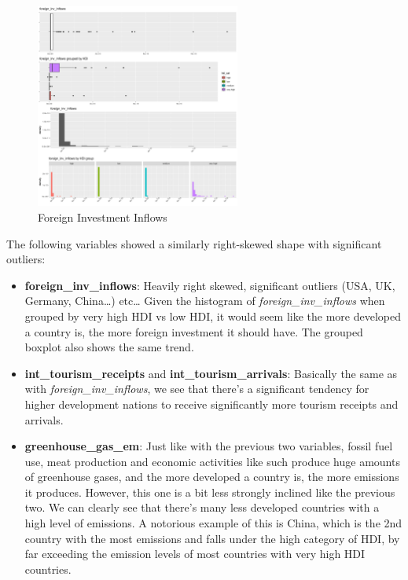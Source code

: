 \documentclass[]{article}
\providecommand{\tightlist}{%
  \setlength{\itemsep}{0pt}\setlength{\parskip}{0pt}}
\begin{document}
\begin{figure}
\centering
\includegraphics[width=0.6\textwidth,height=\textheight]{./img/foreign_inv_inflows.png}
\caption{Foreign Investment Inflows}
\end{figure}

The following variables showed a similarly right-skewed shape with
significant outliers:

\begin{itemize}
\tightlist
\item
  \textbf{foreign\_inv\_inflows}: Heavily right skewed, significant
  outliers (USA, UK, Germany, China\ldots{}) etc\ldots{} Given the
  histogram of \emph{foreign\_inv\_inflows} when grouped by very high
  HDI vs low HDI, it would seem like the more developed a country is,
  the more foreign investment it should have. The grouped boxplot also
  shows the same trend.
\item
  \textbf{int\_tourism\_receipts} and \textbf{int\_tourism\_arrivals}:
  Basically the same as with \emph{foreign\_inv\_inflows}, we see that
  there's a significant tendency for higher development nations to
  receive significantly more tourism receipts and arrivals.
\item
  \textbf{greenhouse\_gas\_em}: Just like with the previous two
  variables, fossil fuel use, meat production and economic activities
  like such produce huge amounts of greenhouse gases, and the more
  developed a country is, the more emissions it produces. However, this
  one is a bit less strongly inclined like the previous two. We can
  clearly see that there's many less developed countries with a high
  level of emissions. A notorious example of this is China, which is the
  2nd country with the most emissions and falls under the high category
  of HDI, by far exceeding the emission levels of most countries with
  very high HDI countries.
\end{itemize}
\end{document}
